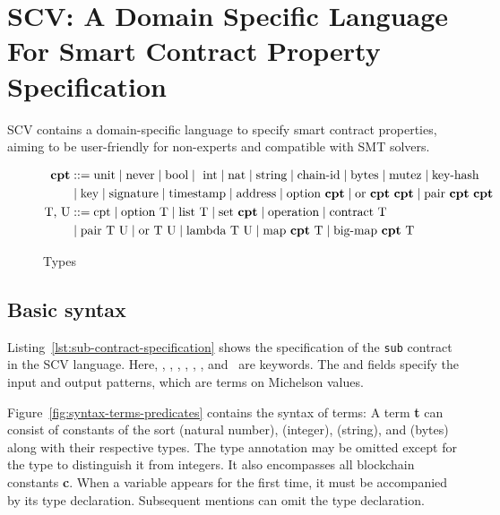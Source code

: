 \documentclass[runningheads]{llncs}
\begin{document}
\section{SCV: A Domain Specific Language For Smart Contract Property Specification}
\label{sec:domain-specific-language}
SCV contains a domain-specific language to specify smart contract properties, aiming to be user-friendly for non-experts and compatible with SMT solvers. 
\begin{figure}[tp]
\begin{align*}
\textbf{cpt} &::= 
   \text{unit} 
   \mid\text{never} 
   \mid\text{bool} 
   \mid\ \text{int}
   \mid\text{nat}
   \mid\text{string}
   \mid\text{chain-id} 
    \mid\text{bytes}
   \mid\text{mutez} 
   \mid\text{key-hash} \\
   &\mid\text{key}
   \mid \text{signature}
   \mid \text{timestamp} 
   \mid \text{address} 
   \mid \text{option}\ \textbf{cpt}
   \mid \text{or}\ \textbf{cpt}\ \textbf{cpt}
   \mid \text{pair}\ \textbf{cpt}\ \textbf{cpt} \\
\text{T, U} &::= 
    \text{cpt}
   \mid \text{option}\ \text{T}
   \mid \text{list}\ \text{T}
   \mid \text{set}\ \textbf{cpt} 
   \mid \text{operation} 
   \mid \text{contract}\ \text{T} \\
  & \mid \text{pair}\ \text{T}\ \text{U}
   \mid \text{or}\ \text{T}\ \text{U}
   \mid \text{lambda}\ \text{T}\ \text{U} 
   \mid \text{map}\ \textbf{cpt}\ \text{T}
   \mid \text{big-map}\ \textbf{cpt}\ \text{T}
\end{align*}
\caption{Types}
\label{fig:types}
\end{figure}
\subsection{Basic syntax}
\label{sec:basic-syntax}
Listing~\ref{lst:sub-contract-specification} shows the specification of the \texttt{sub} contract in the SCV language. Here, \KMCONTRACT, \KSPEC, \KCODE, \KINPUT, \KOUTPUT, \KPRECONDI, and \KPOSTCONDI\ are keywords. The \KINPUT{} and \KOUTPUT{} fields specify the input and output patterns, which are terms on Michelson values.

Figure~\ref{fig:syntax-terms-predicates} contains the syntax of terms: A term \textbf{t} can consist of constants of the sort  (natural number),  (integer),  (string), and  (bytes) along with their respective types. The type annotation may be omitted except for the type  to distinguish it from integers. It also encompasses all blockchain constants \textbf{c}. When a variable appears for the first time, it must be accompanied by its type declaration. Subsequent mentions can omit the type declaration.
\end{document}
